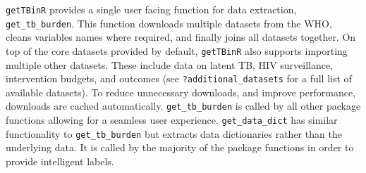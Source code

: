 \documentclass[11pt,twoside]{bristolthesis}
\begin{document}
  \texttt{getTBinR} provides a single user facing function for data extraction, \texttt{get\_tb\_burden}. This function downloads multiple datasets from the WHO, cleans variables names where required, and finally joins all datasets together. On top of the core datasets provided by default, \texttt{getTBinR} also supports importing multiple other datasets. These include data on latent TB, HIV surveillance, intervention budgets, and outcomes (see \texttt{?additional\_datasets} for a full list of available datasets). To reduce unnecessary downloads, and improve performance, downloads are cached automatically. \texttt{get\_tb\_burden} is called by all other package functions allowing for a seamless user experience. \texttt{get\_data\_dict} has similar functionality to \texttt{get\_tb\_burden} but extracts data dictionaries rather than the underlying data. It is called by the majority of the package functions in order to provide intelligent labels.
  
\end{document}
